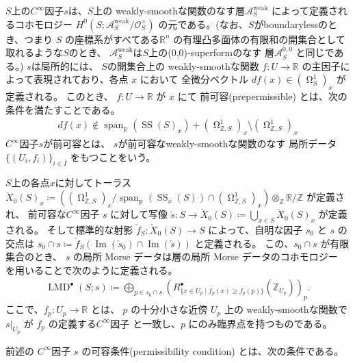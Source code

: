 \documentclass[uplatex,dvipdfmx,12pt]{jsarticle}
\numberwithin{equation}{section}
\theoremstyle{definition}
\newcommand{\deq}{\coloneqq}
\newcommand{\opn}[1]{\operatorname{#1}}
\DeclareMathOperator{\tform}{\Omega}
\begin{document}
$S$上の$C^{\infty}$因子$s$は、$S$上の
weakly-smoothな関数のなす層$\mathcal{A}^{\mathrm{weak}}_S$
によって定義されるコホモロジー
$H^{0}(S;\mathcal{A}^{\mathrm{weak}}_S/\mathcal{O}^{\times}_S)$
の元である。(なお、$S$がboundarylessのとき、つまり
$S$ の座標系がすべてある$\mathbb{R}^{n}$ 
の有理凸多面体の有限和の開集合として取れるような$S$のとき、
$\mathcal{A}^{\mathrm{weak}}_S$は$S$上の(0,0)-superformのなす
層$\mathcal{A}^{0,0}_S$ \cite{MR3903579}と同じである。)
$s$は局所的には、
$S$の開集合上の 
weakly-smoothな関数 $f\colon U\to \mathbb{R}$
の主因子によって表現されており、各点 $x$ において
全微分ベクトル $df(x)\in(\tform_{S}^{1})_x$ 
が定義される。
このとき、
$f\colon U \to \mathbb{R}$ が $x$ にて
前可容(prepermissible)
とは、次の条件を満たすことである。
\begin{align}
df(x)\notin\opn{span}_{\mathbb{R}}(\opn{SS}(S)_x)+
(\tform_{\mathbb{Z},S}^{1})_x 
\setminus (\tform_{\mathbb{Z},S}^{1})_x
\end{align}
$C^{\infty}$因子$s$が前可容とは、
$s$が前可容なweakly-smoothな関数のなす
局所データ$\{(U_i,f_i)\}_{i\in I}$
をもつことをいう。

$S$上の各点$x$に対してトーラス
$\check{X}_0(S)_x\deq ((\tform^{1}_{\mathbb{Z},S})_x/
\opn{span}_{\mathbb{R}}(\opn{SS}_x(S))\cap 
(\tform^{1}_{\mathbb{Z},S})_x)\otimes_{\mathbb{Z}}
\mathbb{R}/\mathbb{Z}$ が定義され、
前可容な$C^{\infty}$因子 $s$ に対して写像
$\check{s}\colon S\to \check{X}_0(S)\deq 
\bigcup_{x\in S} \check{X}_0(S)_x$ が定義される。 
そして標準的な射影 $\check{f}_{S}\colon \check{X}_0(S)\to S$
によって、自明な因子 $s_0$ と $s$ の交点は
$s_0\cap s\deq \check{f}_{S}(\opn{Im}(\check{s}_0)\cap 
\opn{Im}(\check{s}))$ と定義される。
この、$s_0\cap s$ が有限集合のとき、
$s$ の局所 Morse データは層の局所 Morse データのコホモロジー
を用いることで次のように定義される。
\begin{align} \label{equation-local-morse-data}
\opn{LMD}^{\bullet}(S;s)\deq 
\bigoplus_{p\in s_0\cap s} 
(R^{\bullet}_{\{x\in U_p\mid f_p(x)\geq f_p(p)\}}(\mathbb{Z}_{U_p}))_p.
\end{align}
ここで、$f_p\colon U_p\to \mathbb{R}$ とは、
$p$ の十分小さな近傍 $U_p$ 上の weakly-smoothな関数で
$s|_{U_p}$ が $f_p$ の定義する$C^{\infty}$因子
と一致し、$p$ にのみ臨界点を持つものである。

前述の $C^{\infty}$因子
$s$ の可容条件(permissibility condition)
とは、次の条件である。
\end{document}

